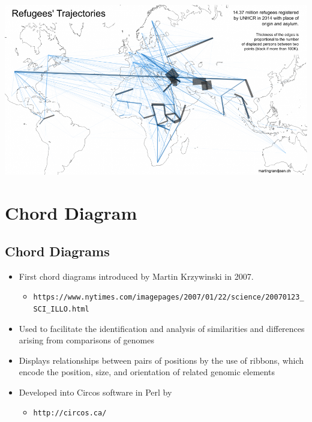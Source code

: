 \documentclass[
]{book}
\providecommand{\tightlist}{%
  \setlength{\itemsep}{0pt}\setlength{\parskip}{0pt}}
\begin{document}
\includegraphics[width=1\linewidth]{img/Refugees-world-930x523}

\hypertarget{chord-diagram}{%
\section{Chord Diagram}\label{chord-diagram}}

\hypertarget{chord-diagrams}{%
\subsection{Chord Diagrams}\label{chord-diagrams}}

\begin{itemize}
\tightlist
\item
  First chord diagrams introduced by Martin Krzywinski in 2007.

  \begin{itemize}
  \tightlist
  \item
    \texttt{https://www.nytimes.com/imagepages/2007/01/22/science/20070123\_SCI\_ILLO.html}
  \end{itemize}
\item
  Used to facilitate the identification and analysis of similarities and differences arising from comparisons of genomes
\item
  Displays relationships between pairs of positions by the use of ribbons, which encode the position, size, and orientation of related genomic elements
\item
  Developed into Circos software in Perl by \citet{Krzywinski2009}

  \begin{itemize}
  \tightlist
  \item
    \texttt{http://circos.ca/}
  \end{itemize}
\end{itemize}
\end{document}
